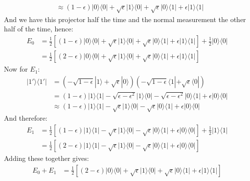 \documentclass[12pt,a4]{article}
\begin{document}
\begin{enumerate}
\begin{enumerate}
\begin{align*}
                                    &\approx (1 - \epsilon)|0\rangle \langle 0| + \sqrt{\epsilon} |1\rangle \langle 0| + \sqrt{\epsilon} |0\rangle \langle 1| + \epsilon |1\rangle \langle 1|
        \end{align*}
        And we have this projector half the time and the normal measurement the other half of the time, hence:
        \begin{align*}
          E_0 &= \frac{1}{2}\left[(1 - \epsilon)|0\rangle \langle 0| + \sqrt{\epsilon} |1\rangle \langle 0| + \sqrt{\epsilon} |0\rangle \langle 1| + \epsilon |1 \rangle \langle 1|\right] + \frac{1}{2} |0 \rangle \langle 0| \\
              &= \frac{1}{2}\left[(2 - \epsilon)|0\rangle \langle 0| + \sqrt{\epsilon} |1\rangle \langle 0| + \sqrt{\epsilon} |0\rangle \langle 1| + \epsilon |1 \rangle \langle 1|\right]
        \end{align*}
        Now for $E_1$:
        \begin{align*}
          | 1' \rangle \langle 1' | 
            &= (-\sqrt{1 - \epsilon}|1\rangle + \sqrt{\epsilon} |0\rangle)(-\sqrt{1 - \epsilon}\langle 1 |+ \sqrt{\epsilon} \langle 0 |)\\
            &= (1 - \epsilon)|1\rangle \langle 1| - \sqrt{\epsilon - \epsilon^2} |1\rangle \langle 0| - \sqrt{\epsilon - \epsilon^2} |0\rangle \langle 1| + \epsilon |0\rangle \langle 0| \\ 
            &\approx (1 - \epsilon)|1\rangle \langle 1| - \sqrt{\epsilon} |1\rangle \langle 0| - \sqrt{\epsilon} |0\rangle \langle 1| + \epsilon |0\rangle \langle 0| 
        \end{align*}
        And therefore:
        \begin{align*}
          E_1 &= \frac{1}{2}\left[(1 - \epsilon)|1\rangle \langle 1| - \sqrt{\epsilon} |1\rangle \langle 0| - \sqrt{\epsilon} |0\rangle \langle 1| + \epsilon |0\rangle \langle 0|\right] + \frac{1}{2} |1\rangle \langle  1|\\
              &= \frac{1}{2}\left[(2 - \epsilon)|1\rangle \langle 1| - \sqrt{\epsilon} |1\rangle \langle 0| - \sqrt{\epsilon} |0\rangle \langle 1| + \epsilon |0\rangle \langle 0|\right] 
        \end{align*}
        Adding these together gives:
        \begin{align*}
          E_0 + E_1 &= \frac{1}{2}\left[(2 - \epsilon)|0\rangle \langle 0| + \sqrt{\epsilon} |1\rangle \langle 0| + \sqrt{\epsilon} |0\rangle \langle 1| + \epsilon |1 \rangle \langle 1|\right]\\

\end{align*}
\end{enumerate}
\end{enumerate}
\end{document}
